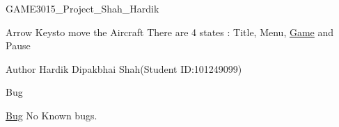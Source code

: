 GAME3015\+\_\+\+Project\+\_\+\+Shah\+\_\+\+Hardik

Arrow Keysto move the Aircraft There are 4 states \+: Title, Menu, \mbox{\hyperlink{class_game}{Game}} and Pause

\begin{DoxyAuthor}{Author}
Hardik Dipakbhai Shah(\+Student ID\+:101249099)
\end{DoxyAuthor}
\begin{DoxyRefDesc}{Bug}
\item[\mbox{\hyperlink{bug__bug000001}{Bug}}]No Known bugs. \end{DoxyRefDesc}
